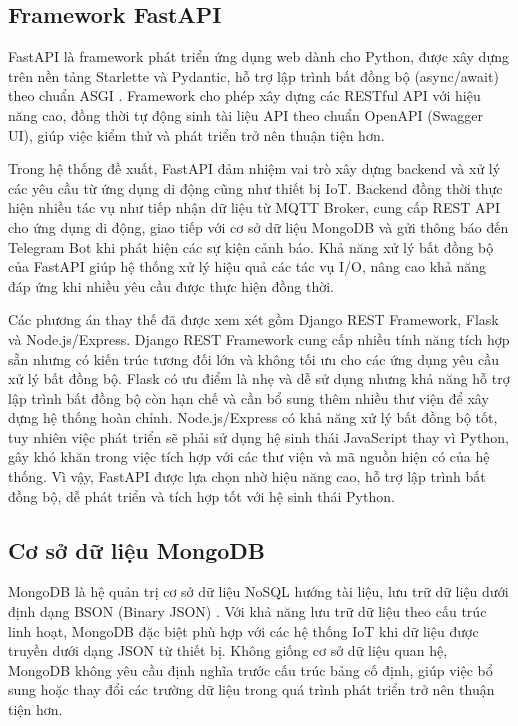 \documentclass[../DoAn.tex]{subfiles}
\begin{document}
\subsection{Framework FastAPI}
\label{subsection:3.3.1}

FastAPI là framework phát triển ứng dụng web dành cho Python, được xây dựng trên nền tảng Starlette và Pydantic, hỗ trợ lập trình bất đồng bộ (async/await) theo chuẩn ASGI \cite{fastapi_docs}. Framework cho phép xây dựng các RESTful API với hiệu năng cao, đồng thời tự động sinh tài liệu API theo chuẩn OpenAPI (Swagger UI), giúp việc kiểm thử và phát triển trở nên thuận tiện hơn.

Trong hệ thống đề xuất, FastAPI đảm nhiệm vai trò xây dựng backend và xử lý các yêu cầu từ ứng dụng di động cũng như thiết bị IoT. Backend đồng thời thực hiện nhiều tác vụ như tiếp nhận dữ liệu từ MQTT Broker, cung cấp REST API cho ứng dụng di động, giao tiếp với cơ sở dữ liệu MongoDB và gửi thông báo đến Telegram Bot khi phát hiện các sự kiện cảnh báo. Khả năng xử lý bất đồng bộ của FastAPI giúp hệ thống xử lý hiệu quả các tác vụ I/O, nâng cao khả năng đáp ứng khi nhiều yêu cầu được thực hiện đồng thời.

Các phương án thay thế đã được xem xét gồm Django REST Framework, Flask và Node.js/Express. Django REST Framework cung cấp nhiều tính năng tích hợp sẵn nhưng có kiến trúc tương đối lớn và không tối ưu cho các ứng dụng yêu cầu xử lý bất đồng bộ. Flask có ưu điểm là nhẹ và dễ sử dụng nhưng khả năng hỗ trợ lập trình bất đồng bộ còn hạn chế và cần bổ sung thêm nhiều thư viện để xây dựng hệ thống hoàn chỉnh. Node.js/Express có khả năng xử lý bất đồng bộ tốt, tuy nhiên việc phát triển sẽ phải sử dụng hệ sinh thái JavaScript thay vì Python, gây khó khăn trong việc tích hợp với các thư viện và mã nguồn hiện có của hệ thống. Vì vậy, FastAPI được lựa chọn nhờ hiệu năng cao, hỗ trợ lập trình bất đồng bộ, dễ phát triển và tích hợp tốt với hệ sinh thái Python.

\subsection{Cơ sở dữ liệu MongoDB}
\label{subsection:3.3.2}

MongoDB là hệ quản trị cơ sở dữ liệu NoSQL hướng tài liệu, lưu trữ dữ liệu dưới định dạng BSON (Binary JSON) \cite{mongodb_docs}. Với khả năng lưu trữ dữ liệu theo cấu trúc linh hoạt, MongoDB đặc biệt phù hợp với các hệ thống IoT khi dữ liệu được truyền dưới dạng JSON từ thiết bị. Không giống cơ sở dữ liệu quan hệ, MongoDB không yêu cầu định nghĩa trước cấu trúc bảng cố định, giúp việc bổ sung hoặc thay đổi các trường dữ liệu trong quá trình phát triển trở nên thuận tiện hơn.
\end{document}
